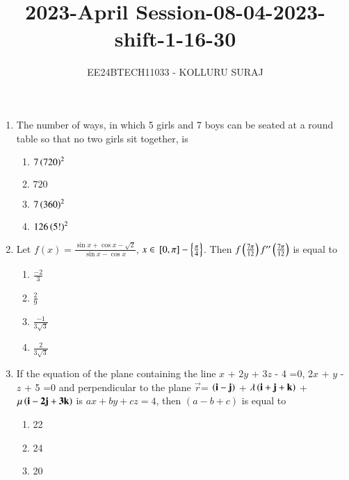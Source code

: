 \documentclass[journal]{IEEEtran}
\numberwithin{equation}{enumi}
\numberwithin{figure}{enumi}
\begin{document}

\title{2023-April Session-08-04-2023-shift-1-16-30}
\author{EE24BTECH11033 - KOLLURU SURAJ}
{\let\newpage\relax\maketitle}
\begin{enumerate}[start=16]
\item The number of ways, in which 5 girls and 7 boys can be seated at a round table so that no two girls sit together, is
\begin{multicols}{4}
    \begin{enumerate}
        \item $7\left(720\right)^2$
        \item $720$
        \item $7\left(360\right)^2$
        \item $126\left(5!\right)^2$
    \end{enumerate}
\end{multicols}
\item Let $f(x) = \frac{\sin x + \cos x - \sqrt{2}}{\sin x - \cos x}$, $x \in {}\left[0, \pi\right]-\left\{\frac{\pi}{4}\right\}$. Then $f\left(\frac{7\pi}{12}\right)f^{\prime\prime}\left(\frac{7\pi}{12}\right)$ is equal to
\begin{multicols}{4}
    \begin{enumerate}
    \item $\frac{-2}{3}$
    \item $\frac{2}{9}$
    \item $\frac{-1}{3\sqrt3}$
    \item $\frac{2}{3\sqrt{3}}$
    \end{enumerate}
\end{multicols}
\item If the equation of the plane containing the line $x$ + $2y$ + $3z$ - 4 =0, $2x$ + $y$ - $z$ + 5 =0 and perpendicular to the plane $\vec{r}$= $\left(\mathbf{i}-\mathbf{j}\right)$ + $\lambda\left(\mathbf{i}+\mathbf{j}+\mathbf{k}\right)$ +$\mu\left(\mathbf{i}-\mathbf{2j}+\mathbf{3k}\right)$ is $ax + by+cz=4$, then $(a-b+c)$ is equal to
\begin{multicols}{4}
    \begin{enumerate}
    \item 22
    \item 24
    \item 20

\end{enumerate}
\end{multicols}
\end{enumerate}
\end{document}
